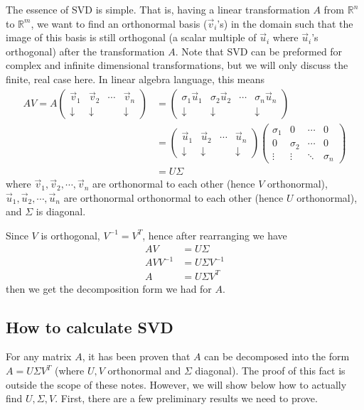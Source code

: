 \documentclass{article}
\begin{document}
The essence of SVD is simple. That is, having a linear transformation $A$ from $\mathbb{R}^n$ to $\mathbb{R}^m$, we want to find an orthonormal basis ($\vec{v}_i$'s) in the domain such that the image of this basis is still orthogonal (a scalar multiple of $\vec{u}_i$ where $\vec{u}_i$'s orthogonal) after the transformation $A$. Note that SVD can be preformed for complex and infinite dimensional transformations, but we will only discuss the finite, real case here. In linear algebra language, this means 
\begin{align*}
AV =A \begin{pmatrix} \vec{v}_1 & \vec{v}_2 & \cdots & \vec{v}_n  \\ \downarrow & \downarrow & &\downarrow \end{pmatrix} &= \begin{pmatrix} \sigma_1 \vec{u}_1 & \sigma_2 \vec{u}_2 & \cdots &\sigma_n \vec{u}_n  \\ \downarrow & \downarrow & &\downarrow \end{pmatrix} \\
&= \begin{pmatrix} \vec{u}_1 & \vec{u}_2 & \cdots & \vec{u}_n  \\ \downarrow & \downarrow & &\downarrow \end{pmatrix} \begin{pmatrix} \sigma_1 & 0 & \cdots & 0 \\ 0& \sigma_2 & \cdots & 0 \\ \vdots & \vdots & \ddots & \sigma_n \end{pmatrix} \\
&= U \Sigma
\end{align*}
where $\vec{v}_1, \vec{v}_2, \cdots, \vec{v}_n$ are orthonormal to each other (hence $V$ orthonormal), $\vec{u}_1, \vec{u}_2, \cdots, \vec{u}_n$ are orthonormal orthonormal to each other (hence $U$ orthonormal), and $\Sigma$ is diagonal.

Since $V$ is orthogonal, $V^{-1} = V^T$, hence after rearranging we have
\begin{align*}
AV &= U \Sigma \\
AV V^{-1} &= U \Sigma V^{-1} \\
A &= U\Sigma V^T
\end{align*}
then we get the decomposition form we had for $A$.

\subsection{How to calculate SVD}
For any matrix $A$, it has been proven that $A$ can be decomposed into the form $A = U \Sigma V^T$ (where $U,V$ orthonormal and $\Sigma$ diagonal). The proof of this fact is outside the scope of these notes. However, we will show below how to actually find $U, \Sigma, V$. First, there are a few preliminary results we need to prove.
\bigskip
\end{document}
